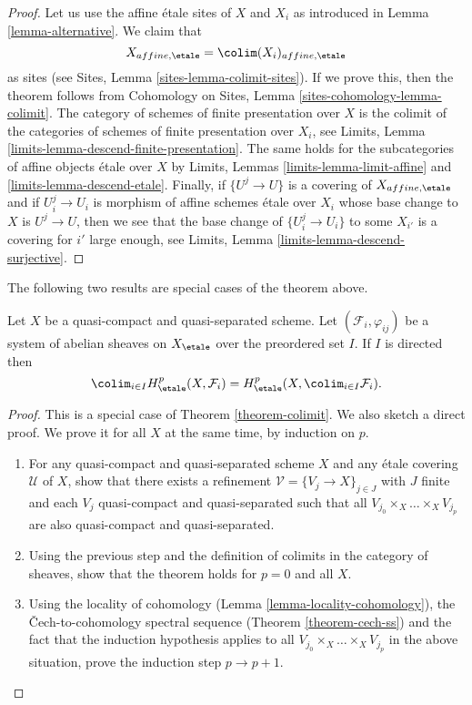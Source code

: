 \begin{proof}
Let us use the affine \'etale sites of $X$ and $X_i$ as introduced
in Lemma \ref{lemma-alternative}. We claim that
$$
X_{affine, \etale} = \colim (X_i)_{affine, \etale}
$$
as sites (see Sites, Lemma \ref{sites-lemma-colimit-sites}).
If we prove this, then the theorem follows from
Cohomology on Sites, Lemma \ref{sites-cohomology-lemma-colimit}.
The category of schemes of finite presentation over $X$ is the
colimit of the categories of schemes of finite presentation over $X_i$, see
Limits, Lemma \ref{limits-lemma-descend-finite-presentation}.
The same holds for the subcategories of affine objects \'etale over
$X$ by Limits, Lemmas
\ref{limits-lemma-limit-affine} and \ref{limits-lemma-descend-etale}.
Finally, if $\{U^j \to U\}$ is a covering of $X_{affine, \etale}$
and if $U_i^j \to U_i$ is morphism of affine schemes \'etale over
$X_i$ whose base change to $X$ is $U^j \to U$, then we see that
the base change of $\{U^j_i \to U_i\}$ to some $X_{i'}$ is
a covering for $i'$ large enough, see
Limits, Lemma \ref{limits-lemma-descend-surjective}.
\end{proof}

\noindent
The following two results are special cases of the theorem above.

\begin{lemma}
\label{lemma-colimit}
Let $X$ be a quasi-compact and quasi-separated scheme. Let
$\left(\mathcal{F}_i, \varphi_{ij}\right)$ be a system of abelian sheaves on
$X_\etale$ over the preordered set $I$. If $I$ is directed then
$$
\colim_{i\in I} H_\etale^p(X, \mathcal{F}_i) = H_\etale^p(X,
\colim_{i\in I} \mathcal{F}_i).
$$
\end{lemma}

\begin{proof}
This is a special case of Theorem \ref{theorem-colimit}.
We also sketch a direct proof.
We prove it for all $X$ at the same time, by induction on $p$.
\begin{enumerate}
\item
For any quasi-compact and quasi-separated scheme $X$ and any \'etale covering
$\mathcal{U}$ of $X$, show that there exists a refinement
$\mathcal{V} = \{V_j \to X\}_{j\in J}$ with $J$ finite and each $V_j$
quasi-compact and quasi-separated such that all
$V_{j_0} \times_X \ldots \times_X V_{j_p}$ are also
quasi-compact and quasi-separated.
\item
Using the previous step and the definition of colimits in the category of
sheaves, show that the theorem holds for $p = 0$ and all $X$.
\item
Using the locality of cohomology
(Lemma \ref{lemma-locality-cohomology}),
the {\v C}ech-to-cohomology spectral sequence
(Theorem \ref{theorem-cech-ss}) and the fact that the induction
hypothesis applies to all
$V_{j_0} \times_X \ldots \times_X V_{j_p}$
in the above situation, prove the induction step $p \to p + 1$.
\end{enumerate}
\end{proof}

